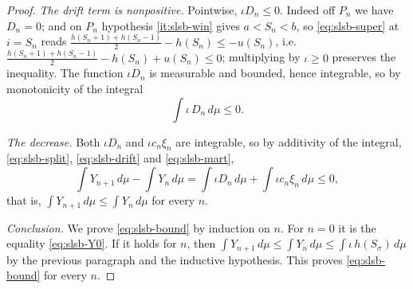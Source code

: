 \begin{proof}
\emph{The drift term is nonpositive.} Pointwise, $\iota D_n\le0$. Indeed off
$P_n$ we have $D_n=0$; and on $P_n$ hypothesis \ref{it:slsb-win} gives
$a<S_n<b$, so \eqref{eq:slsb-super} at $i=S_n$ reads
$\frac{h(S_n+1)+h(S_n-1)}{2}-h(S_n)\le-u(S_n)$, i.e.
$\frac{h(S_n+1)+h(S_n-1)}{2}-h(S_n)+u(S_n)\le0$; multiplying by
$\iota\ge0$ preserves the inequality. The function $\iota D_n$ is measurable and
bounded, hence integrable, so by monotonicity of the integral
\begin{equation}\label{eq:slsb-drift}
  \int\iota\,D_n\,d\mu\le0 .
\end{equation}

\emph{The decrease.} Both $\iota D_n$ and $\iota c_n\xi_n$ are integrable, so by
additivity of the integral, \eqref{eq:slsb-split}, \eqref{eq:slsb-drift} and
\eqref{eq:slsb-mart},
\[
  \int Y_{n+1}\,d\mu-\int Y_n\,d\mu
   =\int\iota D_n\,d\mu+\int\iota c_n\xi_n\,d\mu\le0 ,
\]
that is, $\int Y_{n+1}\,d\mu\le\int Y_n\,d\mu$ for every $n$.

\emph{Conclusion.} We prove \eqref{eq:slsb-bound} by induction on $n$. For
$n=0$ it is the equality \eqref{eq:slsb-Y0}. If it holds for $n$, then
$\int Y_{n+1}\,d\mu\le\int Y_n\,d\mu\le\int\iota\,h(S_\sigma)\,d\mu$ by the
previous paragraph and the inductive hypothesis. This proves
\eqref{eq:slsb-bound} for every $n$.
\end{proof}
